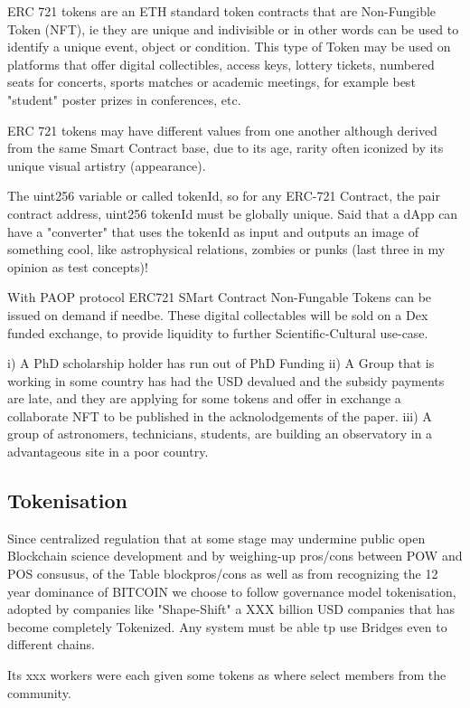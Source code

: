 \documentclass[final,5p,times,twocolumn,authoryear]{elsarticle}
\begin{document}
ERC 721 tokens are an ETH standard token contracts that are Non-Fungible Token (NFT), ie they are unique and indivisible or in other words can be used to identify a unique event, object or condition. This type of Token may be used on platforms that offer digital collectibles, access keys, lottery tickets, numbered seats for concerts, sports matches or academic meetings, for example best "student" poster prizes in conferences, etc. 

ERC 721 tokens may have different values from one another although derived from the same Smart Contract base, due to its age, rarity often iconized by its unique visual artistry (appearance).

The uint256 variable or called tokenId, so for any ERC-721 Contract, the pair contract address, uint256 tokenId must be globally unique. Said that a dApp can have a "converter" that uses the tokenId as input and outputs an image of something cool, like astrophysical relations,  zombies or punks (last three in my opinion as test concepts)!


With PAOP protocol ERC721 SMart Contract Non-Fungable Tokens can be issued on demand if needbe. These digital collectables will be sold on a Dex funded exchange, to provide liquidity to further Scientific-Cultural use-case.

i) A PhD scholarship holder has run out of PhD Funding 
ii) A Group that is working in some country has had the USD devalued and the subsidy payments are late, and they are applying for some tokens and offer in exchange a collaborate NFT to be published in the acknolodgements of the paper.
iii) A group of astronomers, technicians, students,  are building an observatory in a advantageous site in a poor country. 

\subsection{Tokenisation}

Since centralized regulation that at some stage may undermine public open Blockchain science development and by weighing-up pros/cons between POW and POS consusus, of the Table blockpros/cons as well as from recognizing the 12 year dominance of BITCOIN we choose to follow governance model tokenisation, adopted by  companies like "Shape-Shift" a XXX billion USD companies that has become completely Tokenized. Any system must be able tp use Bridges even to different chains. 

Its xxx workers were each given some tokens as where select members from the community. 
\end{document}
